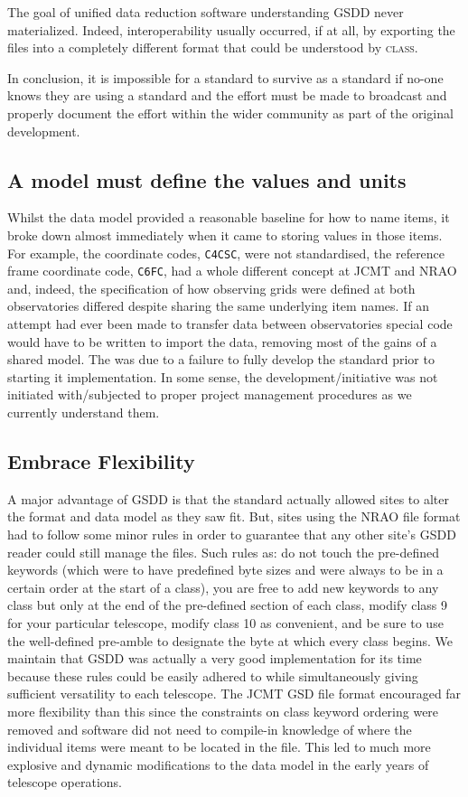 \documentclass[final,authoryear,5p,times,twocolumn]{elsarticle}
\begin{document}
The goal of unified data reduction software understanding GSDD never
materialized. Indeed, interoperability usually occurred, if at all, by exporting
the files into a completely different format that could be understood
by \textsc{class}.

In conclusion, it is impossible for a standard to survive as a standard
if no-one knows they are using a standard and the effort must be made
to broadcast and properly document the effort within the wider
community as part of the original development.

\subsection{A model must define the values and units}

Whilst the data model provided a reasonable baseline for how to name
items, it broke down almost immediately when it came to storing values
in those items. For example, the coordinate codes, \texttt{C4CSC},
were not standardised, the reference frame coordinate code,
\texttt{C6FC}, had a whole different concept at JCMT and NRAO and,
indeed, the specification of how observing grids were defined at both
observatories differed despite sharing the same underlying item
names. If an attempt had ever been made to transfer data between
observatories special code would have to be written to import the
data, removing most of the gains of a shared model.
The was due to a failure to fully develop the standard prior to
starting it implementation. In some sense, the development/initiative
was not initiated with/subjected to proper project management
procedures as we currently understand them.

\subsection{Embrace Flexibility}

A major advantage of GSDD is that the standard actually allowed sites
to alter the format and data model as they saw fit.  But, sites using
the NRAO file format had to follow some minor rules in order to
guarantee that any other site's GSDD reader could still manage the
files.  Such rules as: do not touch the pre-defined keywords (which
were to have predefined byte sizes and were always to be in a certain
order at the start of a class), you are free to add new keywords to
any class but only at the end of the pre-defined section of each
class, modify class 9 for your particular telescope, modify class 10
as convenient, and be sure to use the well-defined pre-amble to
designate the byte at which every class begins.  We maintain that GSDD
was actually a very good implementation for its time because these
rules could be easily adhered to while simultaneously giving
sufficient versatility to each telescope. The JCMT GSD file format
encouraged far more flexibility than this since the constraints on
class keyword ordering were removed and software did not need to
compile-in knowledge of where the individual items were meant to be
located in the file. This led to much more explosive and
dynamic modifications to the data model in the early years of
telescope operations.
\end{document}

